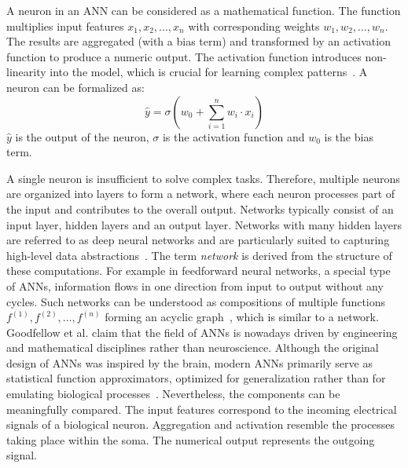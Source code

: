 A neuron in an \ac{ANN} can be considered as a mathematical function.
The function multiplies input features \( x_1, x_2, \ldots, x_n \) with corresponding weights \( w_1, w_2, \ldots, w_n \).
The results are aggregated (with a bias term) and transformed by an activation function to produce a numeric output.
The activation function introduces non-linearity into the model, which is crucial for learning complex patterns~\cite{taye_understanding_2023}.
A neuron can be formalized as:
\begin{equation}
    \hat{y} = \sigma(w_0 + \sum_{i=1}^{n}w_i \cdot x_i)
    \label{annneuronequation}
\end{equation}
\(\hat{y}\) is the output of the neuron, \(\sigma\) is the activation function and \(w_0\) is the bias term.

A single neuron is insufficient to solve complex tasks.
Therefore, multiple neurons are organized into layers to form a network, where each neuron processes part of the input and contributes to the overall output.
Networks typically consist of an input layer, hidden layers and an output layer.
Networks with many hidden layers are referred to as deep neural networks and are particularly suited to capturing high-level data abstractions~\cite{taye_understanding_2023}.
The term \textit{network} is derived from the structure of these computations.
For example in feedforward neural networks, a special type of \acp{ANN}, information flows in one direction from input to output without any cycles.
Such networks can be understood as compositions of multiple functions \( f^{(1)}, f^{(2)}, \ldots, f^{(n)} \) forming an acyclic graph~\cite[p.~164]{goodfellow_deep_2016}, which is similar to a network.
Goodfellow et al. claim that the field of \acp{ANN} is nowadays driven by engineering and mathematical disciplines rather than neuroscience.
Although the original design of \acp{ANN} was inspired by the brain, modern \acp{ANN} primarily serve as statistical function approximators, optimized for generalization rather than for emulating biological processes~\cite[p.~165]{goodfellow_deep_2016}.
Nevertheless, the components can be meaningfully compared.
The input features correspond to the incoming electrical signals of a biological neuron.
Aggregation and activation resemble the processes taking place within the soma.
The numerical output represents the outgoing signal.

